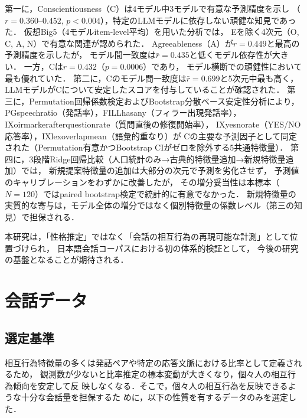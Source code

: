 \documentclass[dvipdfmx,11pt,a4paper]{bxjsarticle}
\renewcommand{\_}{\paperorigunderscore\allowbreak}%
\begin{document}
第一に，Conscientiousness（C）は4モデル中3モデルで有意な予測精度を示し
（$r = 0.360$--$0.452$, $p < 0.004$），特定のLLMモデルに依存しない頑健な知見であった．
仮想Big5（4モデルitem-level平均）を用いた分析では，
Eを除く4次元（O, C, A, N）で有意な関連が認められた．
Agreeableness（A）が$r = 0.449$と最高の予測精度を示したが，
モデル間一致度は$\bar{r} = 0.435$と低くモデル依存性が大きい．
一方，Cは$r = 0.432$（$p = 0.0006$）であり，
モデル横断での頑健性において最も優れていた．
第二に，Cのモデル間一致度は$\bar{r} = 0.699$と5次元中最も高く，
LLMモデルがCについて安定したスコアを付与していることが確認された．
第三に，Permutation回帰係数検定およびBootstrap分散ベース安定性分析により，
PG\_speech\_ratio（発話率），FILL\_has\_any（フィラー出現発話率），
IX\_oirmarker\_after\_question\_rate（質問直後の修復開始率），
IX\_yesno\_rate（YES/NO応答率），IX\_lex\_overlap\_mean（語彙的重なり）が
Cの主要な予測因子として同定された（Permutation有意かつBootstrap CIがゼロを除外する5共通特徴量）．
第四に，3段階Ridge回帰比較（人口統計のみ→古典的特徴量追加→新規特徴量追加）では，
新規提案特徴量の追加は大部分の次元で予測を劣化させず，
予測値のキャリブレーションをわずかに改善したが，
その増分妥当性は本標本（$N = 120$）ではpaired bootstrap検定で統計的に有意でなかった．
新規特徴量の実質的な寄与は，モデル全体の増分ではなく個別特徴量の係数レベル（第三の知見）で担保される．

本研究は，「性格推定」ではなく「会話の相互行為の再現可能な計測」として位置づけられ，
日本語会話コーパスにおける初の体系的検証として，
今後の研究の基盤となることが期待される．


\clearpage


\appendix


\section{会話データ}
\label{sec:supp_dataset}


\subsection{選定基準}
相互行為特徴量の多くは発話ペアや特定の応答文脈における比率として定義されるため，
観測数が少ないと比率推定の標本変動が大きくなり，個々人の相互行為傾向を安定して反
映しなくなる．そこで，個々人の相互行為を反映できるような十分な会話量を担保するた
めに，以下の性質を有するデータのみを選定した．
\end{document}
